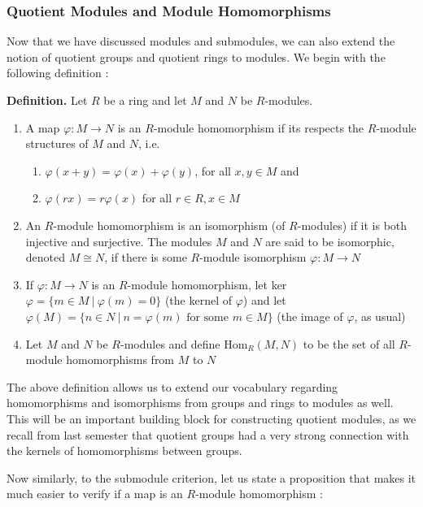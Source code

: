\documentclass[11pt, reqno]{amsart}
\theoremstyle{plain}
\theoremstyle{definition}
\theoremstyle{example}
\def\Hom{\mathrm{Hom}}
\begin{document}
\subsubsection{Quotient Modules and Module Homomorphisms}

Now that we have discussed modules and submodules, we can also extend the notion of quotient groups and quotient rings to modules. We begin with the following definition \cite[\S 10.2, p. 345]{dummit}:

\par
\textbf{Definition.} Let $R$ be a ring and let $M$ and $N$ be $R$-modules.
\begin{enumerate}
\item A map $\varphi: M \to N$ is an $R$-module homomorphism if its respects the $R$-module structures of $M$ and $N$, i.e.
\begin{enumerate}[label=\alph*)]
\item $\varphi(x + y) = \varphi(x) + \varphi(y)$, for all $x, y \in M$ and
\item $\varphi(rx) = r\varphi(x)$ for all $r \in R, x \in M$
\end{enumerate}

\item An $R$-module homomorphism is an isomorphism (of $R$-modules) if it is both injective and surjective. The modules $M$ and $N$ are said to be isomorphic, denoted $M \cong N$, if there is some $R$-module isomorphism $\varphi: M \to N$
\item If $\varphi: M \to N$ is an $R$-module homomorphism, let ker $\varphi = \{m \in M \ | \ \varphi(m) = 0\}$ (the kernel of $\varphi$) and let $\varphi(M) = \{n \in N \ | \ n = \varphi(m) \text{ for some } m \in M\}$ (the image of $\varphi$, as usual)

\item Let $M$ and $N$ be $R$-modules and define $\Hom_R(M,N)$ to be the set of all $R$-module homomorphisms from $M$ to $N$
\end{enumerate}

The above definition allows us to extend our vocabulary regarding homomorphisms and isomorphisms from groups and rings to modules as well. This will be an important building block for constructing quotient modules, as we recall from last semester that quotient groups had a very strong connection with the kernels of homomorphisms between groups.

\par
Now similarly, to the submodule criterion, let us state a proposition that makes it much easier to verify if a map is an $R$-module homomorphism \cite[\S 10.2, p. 346]{dummit}:
\end{document}
